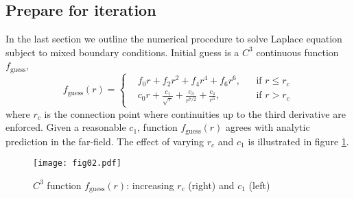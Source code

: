 \documentclass{jfm}
\begin{document}
\subsection{Prepare for iteration}
In the last section we outline the numerical procedure to solve Laplace equation subject to mixed boundary conditions.
Initial guess is a $C^3$ continuous function $f_\mathrm{guess}$,
\begin{equation}
f_\mathrm{guess}(r)=\left\{\begin{aligned}
&f_0r+f_2r^2+f_4r^4+f_6r^6,&&\textrm{if }r\le r_c\\
&c_0 r + \frac{c_1}{\sqrt{r}} +\frac{c_3}{r^{7/2}}+\frac{c_4}{r^{5}},&&\textrm{if }r>r_c
\end{aligned}\right.
\end{equation}
where $r_c$ is the connection point where continuities up to the third derivative are enforced.
Given a reasonable $c_1$, function $f_\mathrm{guess}(r)$ agrees with analytic prediction in the far-field.
The effect of varying $r_c$ and $c_1$ is illustrated in figure \ref{fig:initialGuess}.
\begin{figure}
  \centering
  \texttt{[image: fig02.pdf]}%
  \caption{$C^3$ function $f_\mathrm{guess}(r)$: increasing $r_c$ (right) and $c_1$ (left)  }
\label{fig:initialGuess}
\end{figure}
\end{document}
